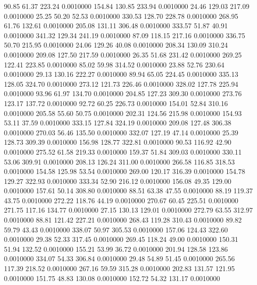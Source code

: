   90.85   61.37  223.24   0.0010000
 154.84  130.85  233.94   0.0010000
  24.46  129.03  217.09   0.0010000
  25.25   50.20   52.53   0.0010000
 330.53  128.70  228.78   0.0010000
 268.95   61.76  132.61   0.0010000
 205.08  131.11  306.48   0.0010000
 333.57   51.87   40.91   0.0010000
 341.32  129.34  241.19   0.0010000
  87.09  118.15  217.16   0.0010000
 336.75   50.70  215.95   0.0010000
  24.06  129.26   40.08   0.0010000
 208.34  130.09  310.24   0.0010000
 209.08  127.50  217.59   0.0010000
  26.35   51.68  231.42   0.0010000
 269.25  122.41  223.85   0.0010000
  85.02   59.98  314.52   0.0010000
  23.88   52.76  230.64   0.0010000
  29.13  130.16  222.27   0.0010000
  89.94   65.05  224.45   0.0010000
 335.13  128.05  324.70   0.0010000
 273.12  121.73  226.46   0.0010000
 328.02  127.78  225.94   0.0010000
  93.96   61.97  134.70   0.0010000
 204.85  127.23  309.30   0.0010000
 273.76  123.17  137.72   0.0010000
  92.72   60.25  226.73   0.0010000
 154.01   52.84  310.16   0.0010000
 205.58   55.60   50.75   0.0010000
 202.31  124.56  215.98   0.0010000
 154.93   53.11   37.59   0.0010000
 333.15  127.84  324.19   0.0010000
 209.08  127.48  306.38   0.0010000
 270.03   56.46  135.50   0.0010000
 332.07  127.19   47.14   0.0010000
  25.39  128.73  309.39   0.0010000
 156.98  128.77  322.81   0.0010000
  90.53  116.92   42.90   0.0010000
 275.52   61.58  219.33   0.0010000
 159.37   51.84  309.03   0.0010000
 330.11   53.06  309.91   0.0010000
 208.13  126.24  311.00   0.0010000
 266.58  116.85  318.53   0.0010000
 154.58  125.98   53.54   0.0010000
 269.00  120.17  316.39   0.0010000
 154.78  129.27  322.93   0.0010000
 333.34   52.90  216.12   0.0010000
 156.08   49.35  129.00   0.0010000
 157.61   50.14  308.80   0.0010000
  88.51   63.38   47.55   0.0010000
  88.19  119.37   43.75   0.0010000
 272.22  118.76   44.19   0.0010000
 270.67   60.45  225.51   0.0010000
 271.75  117.16  134.77   0.0010000
  27.15  130.13  129.01   0.0010000
 272.79   63.55  312.97   0.0010000
  88.81  121.42  227.21   0.0010000
 268.43  119.28  310.43   0.0010000
  89.82   59.79   43.43   0.0010000
 338.07   50.97  305.53   0.0010000
 157.06  124.43  322.60   0.0010000
  29.38   52.33  317.45   0.0010000
 269.45  118.24   49.00   0.0010000
 150.31   51.94  132.52   0.0010000
 155.21   53.99   36.72   0.0010000
 201.94  128.58  123.86   0.0010000
 334.07   54.33  306.84   0.0010000
  29.48   54.89   51.45   0.0010000
 265.56  117.39  218.52   0.0010000
 267.16   59.59  315.28   0.0010000
 202.83  131.57  121.95   0.0010000
 151.75   48.83  130.08   0.0010000
 152.72   54.32  131.17   0.0010000
